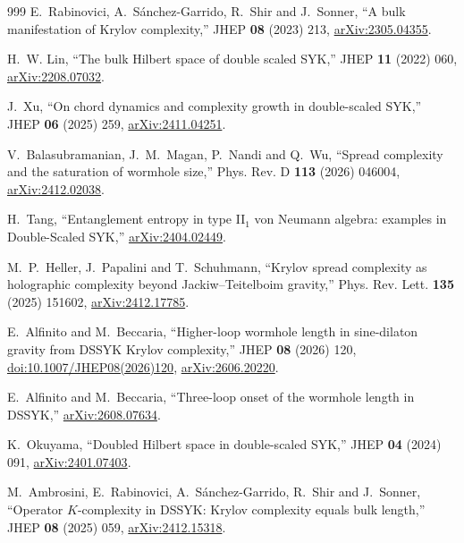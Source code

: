 \documentclass[a4paper,11pt]{article}
\theoremstyle{definition}
\theoremstyle{remark}
\begin{document}
\begin{thebibliography}{999}
E.~Rabinovici, A.~S\'anchez-Garrido, R.~Shir and J.~Sonner,
``A bulk manifestation of Krylov complexity,''
JHEP \textbf{08} (2023) 213,
\href{https://arxiv.org/abs/2305.04355}{arXiv:2305.04355}.

H.~W. Lin,
``The bulk Hilbert space of double scaled SYK,''
JHEP \textbf{11} (2022) 060,
\href{https://arxiv.org/abs/2208.07032}{arXiv:2208.07032}.

J.~Xu,
``On chord dynamics and complexity growth in double-scaled SYK,''
JHEP \textbf{06} (2025) 259,
\href{https://arxiv.org/abs/2411.04251}{arXiv:2411.04251}.

V.~Balasubramanian, J.~M.~Magan, P.~Nandi and Q.~Wu,
``Spread complexity and the saturation of wormhole size,''
Phys. Rev. D \textbf{113} (2026) 046004,
\href{https://arxiv.org/abs/2412.02038}{arXiv:2412.02038}.

H.~Tang,
``Entanglement entropy in type II$_1$ von Neumann algebra: examples in Double-Scaled SYK,''
\href{https://arxiv.org/abs/2404.02449}{arXiv:2404.02449}.

M.~P.~Heller, J.~Papalini and T.~Schuhmann,
``Krylov spread complexity as holographic complexity beyond Jackiw--Teitelboim gravity,''
Phys. Rev. Lett. \textbf{135} (2025) 151602,
\href{https://arxiv.org/abs/2412.17785}{arXiv:2412.17785}.

E.~Alfinito and M.~Beccaria,
``Higher-loop wormhole length in sine-dilaton gravity from DSSYK Krylov complexity,''
JHEP \textbf{08} (2026) 120,
\href{https://doi.org/10.1007/JHEP08(2026)120}{doi:10.1007/JHEP08(2026)120},
\href{https://arxiv.org/abs/2606.20220}{arXiv:2606.20220}.

E.~Alfinito and M.~Beccaria,
``Three-loop onset of the wormhole length in DSSYK,''
\href{https://arxiv.org/abs/2608.07634}{arXiv:2608.07634}.

K.~Okuyama,
``Doubled Hilbert space in double-scaled SYK,''
JHEP \textbf{04} (2024) 091,
\href{https://arxiv.org/abs/2401.07403}{arXiv:2401.07403}.

M.~Ambrosini, E.~Rabinovici, A.~S\'anchez-Garrido, R.~Shir and J.~Sonner,
``Operator $K$-complexity in DSSYK: Krylov complexity equals bulk length,''
JHEP \textbf{08} (2025) 059,
\href{https://arxiv.org/abs/2412.15318}{arXiv:2412.15318}.


\end{thebibliography}
\end{document}
